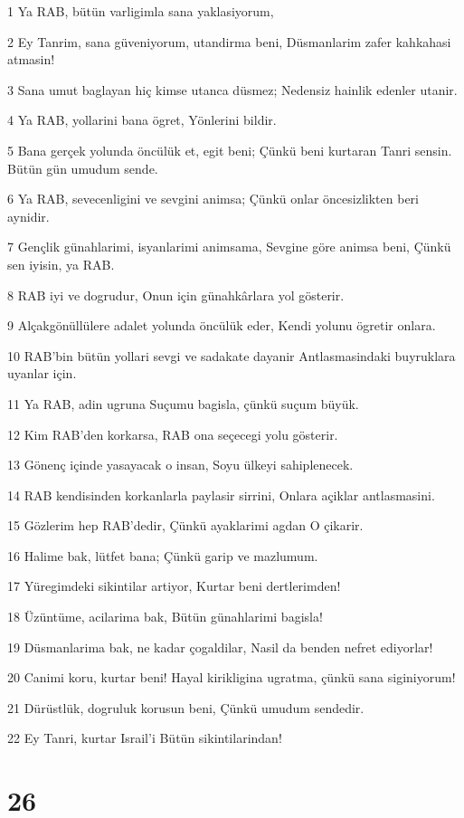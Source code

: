 \par 1 Ya RAB, bütün varligimla sana yaklasiyorum,
\par 2 Ey Tanrim, sana güveniyorum, utandirma beni, Düsmanlarim zafer kahkahasi atmasin!
\par 3 Sana umut baglayan hiç kimse utanca düsmez; Nedensiz hainlik edenler utanir.
\par 4 Ya RAB, yollarini bana ögret, Yönlerini bildir.
\par 5 Bana gerçek yolunda öncülük et, egit beni; Çünkü beni kurtaran Tanri sensin. Bütün gün umudum sende.
\par 6 Ya RAB, sevecenligini ve sevgini animsa; Çünkü onlar öncesizlikten beri aynidir.
\par 7 Gençlik günahlarimi, isyanlarimi animsama, Sevgine göre animsa beni, Çünkü sen iyisin, ya RAB.
\par 8 RAB iyi ve dogrudur, Onun için günahkârlara yol gösterir.
\par 9 Alçakgönüllülere adalet yolunda öncülük eder, Kendi yolunu ögretir onlara.
\par 10 RAB'bin bütün yollari sevgi ve sadakate dayanir Antlasmasindaki buyruklara uyanlar için.
\par 11 Ya RAB, adin ugruna Suçumu bagisla, çünkü suçum büyük.
\par 12 Kim RAB'den korkarsa, RAB ona seçecegi yolu gösterir.
\par 13 Gönenç içinde yasayacak o insan, Soyu ülkeyi sahiplenecek.
\par 14 RAB kendisinden korkanlarla paylasir sirrini, Onlara açiklar antlasmasini.
\par 15 Gözlerim hep RAB'dedir, Çünkü ayaklarimi agdan O çikarir.
\par 16 Halime bak, lütfet bana; Çünkü garip ve mazlumum.
\par 17 Yüregimdeki sikintilar artiyor, Kurtar beni dertlerimden!
\par 18 Üzüntüme, acilarima bak, Bütün günahlarimi bagisla!
\par 19 Düsmanlarima bak, ne kadar çogaldilar, Nasil da benden nefret ediyorlar!
\par 20 Canimi koru, kurtar beni! Hayal kirikligina ugratma, çünkü sana siginiyorum!
\par 21 Dürüstlük, dogruluk korusun beni, Çünkü umudum sendedir.
\par 22 Ey Tanri, kurtar Israil'i Bütün sikintilarindan!

\chapter{26}

